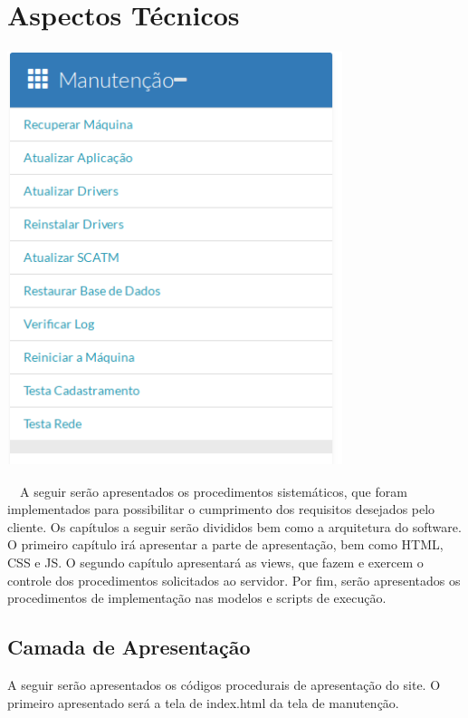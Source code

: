         \bigskip

        \section[Aspectos T\'ecnicos]{Aspectos T\'ecnicos}
        \begin{center}
        \includegraphics[width=9.793cm,height=12.143cm]{figuras/RATCETECATMSTFLS051718v2-img009.png}
        \end{center}
{\color{black}
    \ \ A seguir ser\~ao apresentados os procedimentos sistem\'aticos, que foram implementados para possibilitar o
        cumprimento dos requisitos desejados pelo cliente. Os cap\'itulos a seguir ser\~ao divididos bem como a arquitetura do
        software. O primeiro cap\'itulo ir\'a apresentar a parte de apresenta\c{c}\~ao, bem como HTML, CSS e JS. O segundo
        cap\'itulo apresentar\'a as views, que fazem e exercem o controle dos procedimentos solicitados ao servidor. Por fim,
        ser\~ao apresentados os procedimentos de implementa\c{c}\~ao nas modelos e scripts de execu\c{c}\~ao. }


        \subsection[Camada de Apresenta\c{c}\~ao]{Camada de Apresenta\c{c}\~ao}
{\color{black}
    A seguir ser\~ao apresentados os c\'odigos procedurais de apresenta\c{c}\~ao do site. O primeiro apresentado ser\'a a
        tela de index.html da tela de manuten\c{c}\~ao.}

